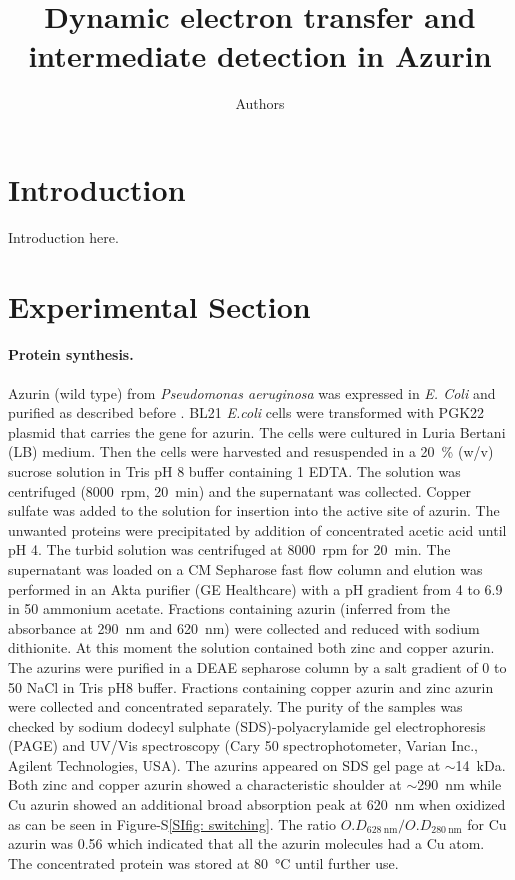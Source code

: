 \documentclass[journal=jacsat,manuscript=article]{achemso}
\author{Authors}
\affiliation{Huygens-Kamerlingh Onnes Laboratory, Leiden University, RA, Leiden, The Netherlands}
\title[]
{Dynamic electron transfer and intermediate detection in Azurin}
\begin{document}
\section{Introduction}
Introduction here.
\section{Experimental Section}

\paragraph*{Protein synthesis.}
Azurin (wild type) from \textit{Pseudomonas aeruginosa} was expressed in \textit{E. Coli} and purified as described before \citep{kamp1990purification}.
BL21 \textit{E.coli} cells were transformed with PGK22 plasmid that carries the gene for azurin.
The cells were cultured in Luria Bertani (LB) medium.
Then the cells were harvested and resuspended in a \SI{20}{\percent} (w/v) sucrose solution in Tris pH 8 buffer containing \SI{1}{\mM} EDTA.
The solution was centrifuged (\SI{8000}{ rpm}, \SI{20}{\minute}) and the supernatant was collected.
Copper sulfate was added to the solution for insertion into the active site of azurin.
The unwanted proteins were precipitated by addition of concentrated acetic acid until pH 4. 
The turbid solution was centrifuged at \SI{8000}{ rpm} for \SI{20}{\minute}.
The supernatant was loaded on a CM Sepharose fast flow column and elution was performed in an Akta purifier (GE Healthcare) with a pH gradient from 4 to 6.9 in 
\SI{50}{\mM} ammonium acetate.
Fractions containing azurin (inferred from the absorbance at \SI{290}{\nm} and \SI{620}{\nm}) were collected and reduced with sodium dithionite.
At this moment the solution contained both zinc and copper azurin.
The azurins were purified in a DEAE sepharose column by a salt gradient of 0 to \SI{50}{\mM} NaCl in Tris pH8 buffer. 
Fractions containing copper azurin and zinc azurin were collected and concentrated separately.
The purity of the samples was checked by sodium dodecyl sulphate (SDS)-polyacrylamide gel electrophoresis (PAGE) and UV/Vis spectroscopy (Cary 50 spectrophotometer, Varian Inc., Agilent Technologies, USA).
The azurins appeared on SDS gel page at $\sim$\SI{14}{ kDa}.
Both zinc and copper azurin showed a characteristic shoulder at ${\sim}$\SI{290}{\nm} while Cu azurin showed an additional 
broad absorption peak at \SI{620}{\nm} when oxidized as can be seen in Figure-S\ref{SIfig: switching}. 
The ratio $O.D_{\SI{628}{\nm}}/O.D_{\SI{280}{\nm}}$ for Cu azurin was 0.56 which indicated that all the azurin molecules had a Cu atom. 
The concentrated protein was stored at \SI{80}{\celsius} until further use.
\end{document}
